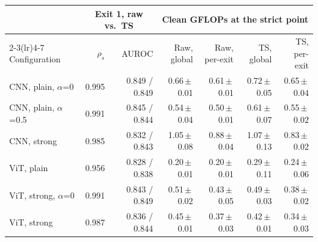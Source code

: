 \begin{tabular}{lrrrrrr}
\toprule
 & \multicolumn{2}{c}{Exit 1, raw vs.\ TS} & \multicolumn{4}{c}{Clean GFLOPs at the strict point} \\
\cmidrule(lr){2-3}\cmidrule(lr){4-7}
Configuration & $\rho_s$ & AUROC & Raw, global & Raw, per-exit & TS, global & TS, per-exit \\
\midrule
CNN, plain, $\alpha$=0 & 0.995 & 0.849 / 0.849 & 0.66\,$\pm$\,0.01 & 0.61\,$\pm$\,0.01 & 0.72\,$\pm$\,0.05 & 0.65\,$\pm$\,0.04 \\
CNN, plain, $\alpha$=0.5 & 0.991 & 0.845 / 0.844 & 0.54\,$\pm$\,0.04 & 0.50\,$\pm$\,0.01 & 0.61\,$\pm$\,0.07 & 0.55\,$\pm$\,0.02 \\
CNN, strong & 0.985 & 0.832 / 0.843 & 1.05\,$\pm$\,0.08 & 0.88\,$\pm$\,0.04 & 1.07\,$\pm$\,0.13 & 0.83\,$\pm$\,0.02 \\
ViT, plain & 0.956 & 0.828 / 0.838 & 0.20\,$\pm$\,0.01 & 0.20\,$\pm$\,0.01 & 0.29\,$\pm$\,0.11 & 0.24\,$\pm$\,0.06 \\
ViT, strong, $\alpha$=0 & 0.991 & 0.843 / 0.849 & 0.51\,$\pm$\,0.02 & 0.43\,$\pm$\,0.05 & 0.49\,$\pm$\,0.03 & 0.38\,$\pm$\,0.02 \\
ViT, strong & 0.987 & 0.836 / 0.844 & 0.45\,$\pm$\,0.01 & 0.37\,$\pm$\,0.03 & 0.42\,$\pm$\,0.01 & 0.34\,$\pm$\,0.03 \\
\bottomrule
\end{tabular}
